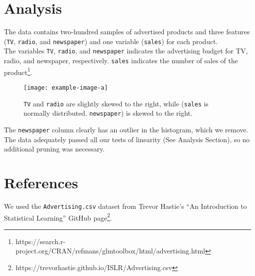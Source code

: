 \documentclass{article}
\begin{document}
\section{Analysis}
 The data contains two-hundred samples of advertised products and three features (\texttt{TV}, \texttt{radio}, and \texttt{newspaper}) and one variable (\texttt{sales}) for each product.\\
 The variables \texttt{TV}, \texttt{radio}, and \texttt{newspaper} indicates the advertising budget for TV, radio, and newspaper, respectively. \texttt{sales} indicates the number of sales of the product\footnote{https://search.r-project.org/CRAN/refmans/glmtoolbox/html/advertising.html}. \\
 \begin{figure}[!h]
	 \centering
	 \texttt{[image: example-image-a]}
\caption{\texttt{TV} and \texttt{radio} are slightly skewed to the right, while (\texttt{sales} is normally distributed.   \texttt{newspaper}) is skewed to the right.}
 \end{figure}



The \texttt{newspaper} column clearly has an outlier in the histogram, which we remove.  The data adequately passed all our tests of linearity (See Analysis Section), so no additional pruning was necessary.


\section{References}
We used the \texttt{Advertising.csv} dataset from Trevor Hastie’s “An Introduction to Statistical Learning”  GitHub page\footnote{https://trevorhastie.github.io/ISLR/Advertising.csv}.
\end{document}
